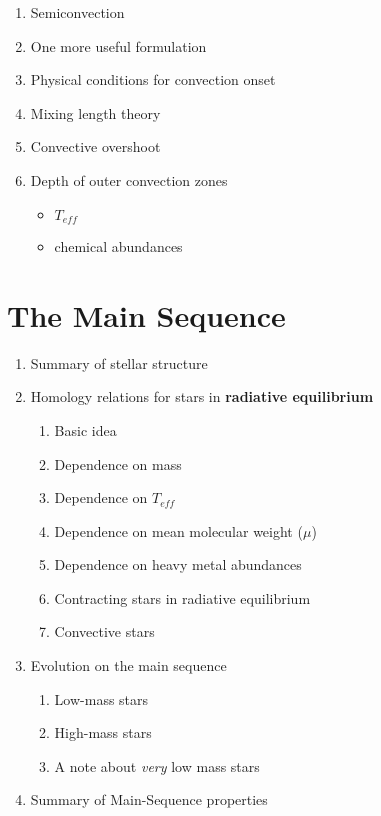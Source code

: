 \documentclass{article}
\begin{document}
\begin{enumerate}
\begin{enumerate}
            \item Semiconvection
            \item One more useful formulation
            \item Physical conditions for convection onset
            \item Mixing length theory
            \item Convective overshoot
            \item Depth of outer convection zones
                \begin{itemize}
                  \item $T_{eff}$
                  \item chemical abundances
                \end{itemize}
        \end{enumerate}
\end{enumerate}
\section{The Main Sequence}
\begin{enumerate}
    \item Summary of stellar structure
    \item Homology relations for stars in \textbf{radiative equilibrium}
        \begin{enumerate}
            \item Basic idea
            \item Dependence on mass
            \item Dependence on ${T_{eff}}$
            \item Dependence on mean molecular weight (${\mu}$)
            \item Dependence on heavy metal abundances
            \item Contracting stars in radiative equilibrium
            \item Convective stars
        \end{enumerate}
    \item Evolution on the main sequence
        \begin{enumerate}
            \item Low-mass stars
            \item High-mass stars
            \item A note about \emph{very} low mass stars
        \end{enumerate}
    \item Summary of Main-Sequence properties
\end{enumerate}
\newpage
\end{document}
